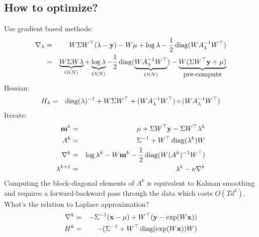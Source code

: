 \documentclass[10pt,english]{article}
\begin{document}
\subsection{How to optimize?}
Use gradient based methods:
\begin{eqnarray*}
 \nabla_\lambda		&=&		W\Sigma W^\top (\lambda-\mathbf{y})-W\mu+\log\lambda-\frac{1}{2}\operatorname{diag}(WA^{-1}_\lambda W^\top)\\
			&=&		\underbrace{W\Sigma W \lambda}_{O(N)}+\underbrace{\log\lambda}_{O(N)}-\frac{1}{2}\operatorname{diag}(\underbrace{WA^{-1}_\lambda W^\top}_{O(N)})-\underbrace{W(\Sigma W^\top\mathbf{y}+\mu)}_{\mbox{pre-compute}}
\end{eqnarray*}
Hessian:
\begin{eqnarray*}
 H_\lambda		&=&		\operatorname{diag}(\lambda)^{-1}+W\Sigma W^\top + (WA^{-1}_\lambda W^\top)\circ(WA^{-1}_\lambda W^\top)
\end{eqnarray*}
Iterate:
\begin{eqnarray*}
 \mathbf{m}^k			&=&		\mu+\Sigma W^\top\mathbf{y}-\Sigma W^\top\lambda^k\\
 A^k			&=&		\Sigma^{-1}+W^\top \operatorname{diag}(\lambda^k)W\\
 \nabla^k		&=&		\log\lambda^k-W\mathbf{m}^k-\frac{1}{2}\operatorname{diag}(W(A^k)^{-1}W^\top)\\
 \lambda^{k+1}		&=&		\lambda^{k}-\nu \nabla^k
\end{eqnarray*}
Computing the block-diagonal elements of $A^k$ is equivalent to Kalman smoothing and requires a forward-backward pass through the data which costs $O(Td^3)$.\\
What's the relation to Laplace approximation?
\begin{eqnarray*}
 \nabla^k		&=&		-\Sigma^{-1}(\mathbf{x}-\mu)+W^\top(\mathbf{y}-\exp(W\mathbf{x})) \\
 H^k			&=&		-(\Sigma^{-1}+W^\top \operatorname{diag}(\exp(W\mathbf{x}))W)
\end{eqnarray*}
\end{document}
